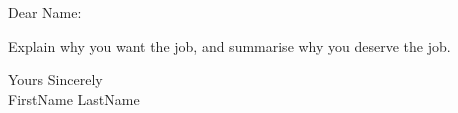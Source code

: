\documentclass[a4paper,english]{friggeri-letter}
\begin{document}

\address{
	123 Fake St \\
	Australia
}


\opening{Dear Name:}

Explain why you want the job, and summarise why you deserve the job.

\closing{
   Yours Sincerely\\
   FirstName LastName
}
\end{document}
